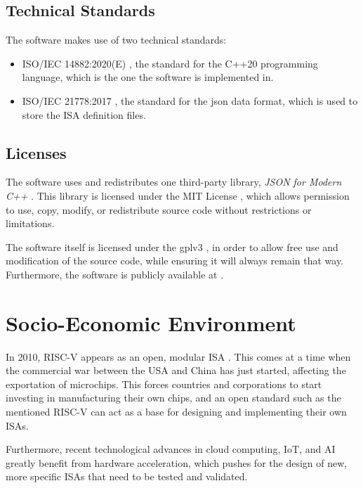 \subsection{Technical Standards}\label{subsec:standards}
The software makes use of two technical standards:
\begin{itemize}
  \item ISO/IEC 14882:2020(E) \parencite{ISOcpp20}, the standard for the C++20 programming language, which is the one the software is implemented in.
  \item ISO/IEC 21778:2017 \parencite{ISO21778}, the standard for the \gls{json} data format, which is used to store the \gls{ISA} definition files.
\end{itemize}


\subsection{Licenses}\label{subsec:licenses}
The software uses and redistributes one third-party library, \textit{JSON for Modern C++} \parencite{nlohmann/json}. This library is licensed under the MIT License \parencite{MITLicense}, which allows permission to use, copy, modify, or redistribute source code without restrictions or limitations.

The software itself is licensed under the \gls{gplv3} \parencite{gplv3}, in order to allow free use and modification of the source code, while ensuring it will always remain that way. Furthermore, the software is publicly available at \myrepo.



\section{Socio-Economic Environment}\label{sec:environment}
In 2010, RISC-V appears as an open, modular \gls{ISA} \parencite{riscvOrigin}. This comes at a time when the commercial war between the USA and China has just started, affecting the exportation of microchips. This forces countries and corporations to start investing in manufacturing their own chips, and an open standard such as the mentioned RISC-V can act as a base for designing and implementing their own \glspl{ISA}.

Furthermore, recent technological advances in \gls{cloud computing}, \gls{IoT}, and \gls{AI} greatly benefit from hardware acceleration, which pushes for the design of new, more specific \glspl{ISA} that need to be tested and validated.

